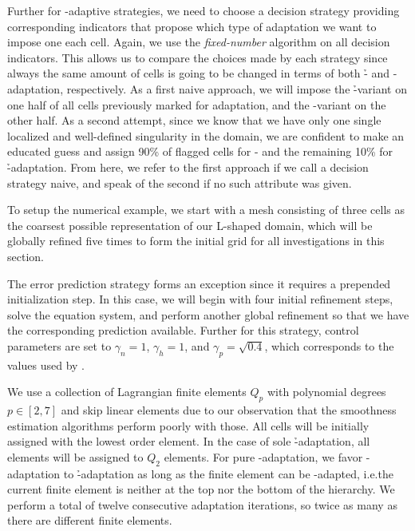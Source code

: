 
Further for \hp-adaptive strategies, we need to choose a decision strategy providing corresponding indicators that propose which type of adaptation we want to impose one each cell.
%
Again, we use the \textit{fixed-number} algorithm on all decision indicators. This allows us to compare the choices made by each strategy since always the same amount of cells is going to be changed in terms of both \h- and \p-adaptation, respectively.
%
As a first naive approach, we will impose the \h-variant on one half of all cells previously marked for adaptation, and the \p-variant on the other half.
As a second attempt, since we know that we have only one single localized and well-defined singularity in the domain, we are confident to make an educated guess and assign 90\% of flagged cells for \p- and the remaining 10\% for \h-adaptation. From here, we refer to the first approach if we call a decision strategy naive, and speak of the second if no such attribute was given.

To setup the numerical example, we start with a mesh consisting of three cells as the coarsest possible representation of our L-shaped domain, which will be globally refined five times to form the initial grid for all investigations in this section.

The error prediction strategy forms an exception since it requires a prepended initialization step. In this case, we will begin with four initial refinement steps, solve the equation system, and perform another global refinement so that we have the corresponding prediction available. Further for this strategy, control parameters are set to $\gamma_n = 1$, $\gamma_h = 1$, and $\gamma_p = \sqrt{0.4}$, which corresponds to the values used by \textcites{melenk2001}{mitchell2014}.

We use a collection of Lagrangian finite elements $Q_p$ with polynomial degrees $p \in [2,7]$ and skip linear elements due to our observation that the smoothness estimation algorithms perform poorly with those. All cells will be initially assigned with the lowest order element. In the case of sole \h-adaptation, all elements will be assigned to $Q_2$ elements. For pure \p-adaptation, we favor \p-adaptation to \h-adaptation as long as the finite element can be \p-adapted, i.e.\@ the current finite element is neither at the top nor the bottom of the hierarchy. We perform a total of twelve consecutive adaptation iterations, so twice as many as there are different finite elements.


